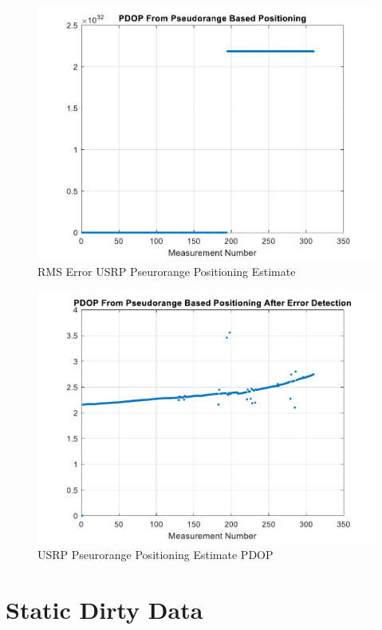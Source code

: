 \documentclass[12pt]{report}
\begin{document}
\begin{figure}[h!]
    \centering
    \includegraphics[width=5in]
    {15min_irid_USRP_pseudo_rmse.pdf}
    \caption{RMS Error USRP Pseurorange Positioning Estimate}
    \label{fig:USRPpseudo15minIridRMSE}
\end{figure}

\begin{figure}[h!]
    \centering
    \includegraphics[width=5in]
    {15min_irid_USRP_pseudo_pdop.pdf}
    \caption{USRP Pseurorange Positioning Estimate PDOP}
    \label{fig:USRPpseudo15minIridPositpdop}
\end{figure}

\section{Static Dirty Data}
\end{document}
